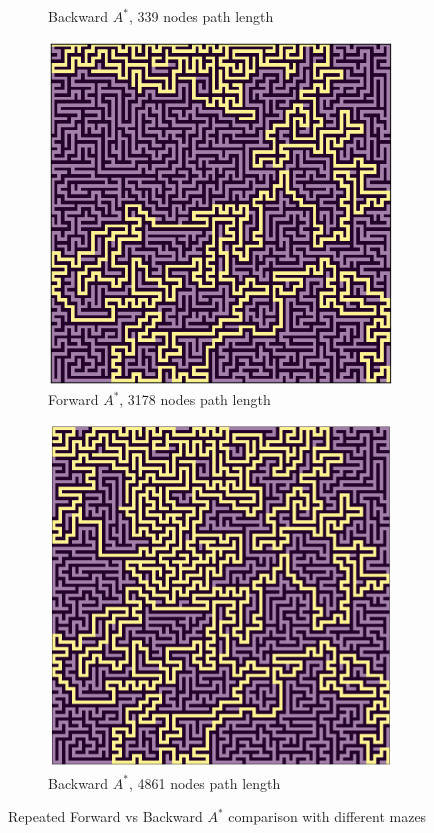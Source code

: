 \begin{figure}[H]
\begin{subfigure}{.5\textwidth}
  \caption{Backward $A^*$, 339 nodes path length}
\end{subfigure}
\newline
\linebreak
\linebreak
\begin{subfigure}{.5\textwidth}
  \centering
  \includegraphics[width=0.8\linewidth]{Report/Part3/larger_g_forward_3178.png}  
  \caption{Forward $A^*$, 3178 nodes path length}
\end{subfigure}
\begin{subfigure}{.5\textwidth}
  \centering
  \includegraphics[width=0.8\linewidth]{Report/Part3/larger_g_backward_4861.png}  
  \caption{Backward $A^*$, 4861 nodes path length}
\end{subfigure}
\caption{Repeated Forward vs Backward $A^*$ comparison with different mazes}
\end{figure}